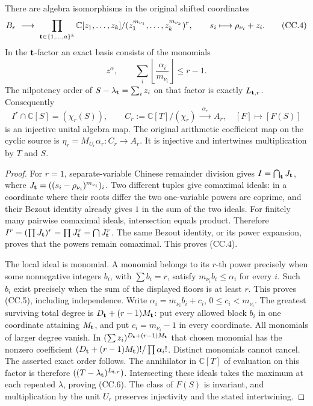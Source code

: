 \begin{theorem}
There are algebra isomorphisms in the original shifted coordinates
\[
 B_r\ \longrightarrow\
 \prod_{{\bf t}\in\{1,\ldots,a\}^k}
 \mathbb C[z_1,\ldots,z_k]/(z_1^{m_{\nu_1}},\ldots,z_k^{m_{\nu_k}})^r,
 \qquad s_i\longmapsto\rho_{\nu_i}+z_i.
 \tag{CC.4}
\]
In the \({\bf t}\)-factor an exact basis consists of the monomials
\[
 z^\alpha,\qquad
 \sum_i\left\lfloor\frac{\alpha_i}{m_{\nu_i}}\right\rfloor\leq r-1.
 \tag{CC.5}
\]
The nilpotency order of \(S-\lambda_{\bf t}=\sum_i z_i\) on that
factor is exactly \(L_{{\bf t},r}\).  Consequently
\[
 I^r\cap\mathbb C[S]=(\chi_r(S)),\qquad
 C_r:=\mathbb C[T]/(\chi_r)
 \ \xrightarrow{\ \alpha_r\ }\ A_r,\quad [F]\longmapsto[F(S)]
 \tag{CC.6}
\]
is an injective unital algebra map.  The original arithmetic coefficient
map on the cyclic source is
\(\eta_r=M_{U_r}\alpha_r:C_r\longrightarrow A_r\).
It is injective and intertwines multiplication by \(T\) and \(S\).
\end{theorem}
\begin{proof}
For \(r=1\), separate-variable Chinese remainder division gives
\(I=\bigcap_{\bf t}J_{\bf t}\), where
\(J_{\bf t}=((s_i-\rho_{\nu_i})^{m_{\nu_i}})_i\).
Two different tuples give comaximal ideals: in a coordinate where
their roots differ the two one-variable powers are coprime, and their
Bezout identity already gives \(1\) in the sum of the two ideals.
For finitely many pairwise comaximal ideals, intersection equals
product.  Therefore
\(I^r=(\prod J_{\bf t})^r=\prod J_{\bf t}^r=\bigcap J_{\bf t}^r\).
The same Bezout identity, or its power expansion, proves that the
powers remain comaximal.  This proves (CC.4).

The local ideal is monomial.  A monomial belongs to its \(r\)-th
power precisely when some nonnegative integers \(b_i\), with
\(\sum b_i=r\), satisfy \(m_{\nu_i}b_i\leq\alpha_i\) for every \(i\).
Such \(b_i\) exist precisely when the sum of the displayed floors is
at least \(r\).  This proves (CC.5), including independence.
Write \(\alpha_i=m_{\nu_i}b_i+c_i\), \(0\leq c_i<m_{\nu_i}\).
The greatest surviving total degree is
\(D_{\bf t}+(r-1)M_{\bf t}\): put every allowed block \(b_i\)
in one coordinate attaining \(M_{\bf t}\), and put
\(c_i=m_{\nu_i}-1\) in every coordinate.
All monomials of larger degree vanish.  In
\((\sum z_i)^{D_{\bf t}+(r-1)M_{\bf t}}\) that chosen monomial
has the nonzero coefficient
\((D_{\bf t}+(r-1)M_{\bf t})!/\prod\alpha_i!\).
Distinct monomials cannot cancel.  The asserted exact order follows.
The annihilator in \(\mathbb C[T]\) of evaluation on this factor is
therefore \(((T-\lambda_{\bf t})^{L_{{\bf t},r}})\).
Intersecting these ideals takes the maximum at each repeated
\(\lambda\), proving (CC.6).  The class of \(F(S)\) is invariant,
and multiplication by the unit \(U_r\) preserves injectivity and
the stated intertwining.
\end{proof}

